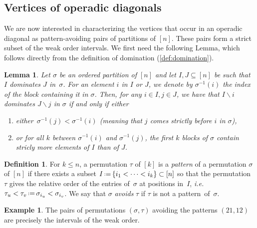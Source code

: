 \documentclass{amsart}
\newcommand{\darkblue}{\color{darkblue}} %
\newtheorem{lemma}[theorem]{Lemma}
\theoremstyle{definition}
\newtheorem{definition}[theorem]{Definition}
\newtheorem{example}[theorem]{Example}
\newcommand{\ssm}{\smallsetminus} %
\newcommand{\eqdef}{\mbox{\,\raisebox{0.2ex}{\scriptsize\ensuremath{\mathrm:}}\ensuremath{=}\,}} %
\newcommand{\ie}{\textit{i.e.}~} %
\newcommand{\defn}[1]{\textsl{\darkblue #1}} %
\begin{document}

\subsection{Vertices of operadic diagonals}
\label{subsec:vertices-operadic-diags}

We are now interested in characterizing the vertices that occur in an operadic diagonal as pattern-avoiding pairs of partitions of $[n]$. 
These pairs form a strict subset of the weak order intervals. 
We first need the following Lemma, which follows directly from the definition of domination (\cref{def:domination}).

\begin{lemma}
\label{lem:Coherent Domination}
Let $\sigma$ be an ordered partition of $[n]$ and let $I,J \subseteq [n]$ be such that $I$ dominates $J$ in~$\sigma$. 
For an element $i$ in $I$ or $J$, we denote by $\sigma^{-1}(i)$ the index of the block containing it in $\sigma$. 
Then, for any $i \in I,j \in J$, we have that $I\ssm i$ dominates $J\ssm j$ in $\sigma$ if and only if either
\begin{enumerate}
	\item either~$\sigma^{-1}(j) < \sigma^{-1}(i)$ (meaning that $j$ comes strictly before $i$ in $\sigma$),
	\item or for all $k$ between $\sigma^{-1}(i)$ and $\sigma^{-1}(j)$, the first $k$ blocks of $\sigma$ contain stricly more elements of $I$ than of $J$.
\end{enumerate}
\end{lemma}


\begin{definition}
For $k\leq n$, a permutation $\tau$ of $[k]$ is a \defn{pattern} of a permutation $\sigma$ of $[n]$ if there exists a subset $I \eqdef \{i_1 < \dots < i_k\} \subset [n]$ so that the permutation~$\tau$ gives the relative order of the entries of~$\sigma$ at positions in~$I$, \ie $\tau_u < \tau_v \eqdef \sigma_{i_u} < \sigma_{i_v}$.
We say that $\sigma$ \defn{avoids} $\tau$ if $\tau$ is not a pattern~of~$\sigma$. 
\end{definition}

\begin{example}
The pairs of permutations $(\sigma,\tau)$ avoiding the patterns $(21,12)$ are precisely the intervals of the weak order. 
\end{example}
\end{document}
